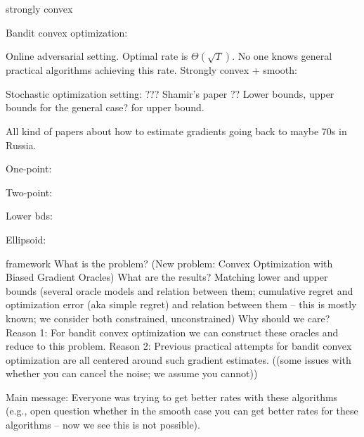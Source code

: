 
strongly convex


Bandit convex optimization:

Online adversarial setting. Optimal rate is $\Theta(\sqrt{T})$.
No one knows general practical algorithms achieving this rate.
Strongly convex + smooth: \cite{hazan2014bandit}

Stochastic optimization setting: ??? Shamir's paper \cite{shamir2012complexity}??
Lower bounds, upper bounds for the general case?
\cite{hazan2014bandit} for upper bound.

All kind of papers about how to estimate gradients going back to maybe 70s in Russia.

One-point: \cite{flaxman2005online}

Two-point: \cite{AgDeXi10}

Lower bds: \cite{raginsky2011information} \cite{Chen88:LB-AoS}

Ellipsoid: \cite{AgFoHsuKaRa13:SIAM}



 framework
What is the problem? (New problem: Convex Optimization with Biased Gradient Oracles)
What are the results? Matching lower and upper bounds (several oracle models and relation between them; cumulative regret and optimization error (aka simple regret) and relation between them -- this is mostly known; we consider both constrained, unconstrained)
Why should we care?
Reason 1: For bandit convex optimization we can construct these oracles and reduce to this problem.
Reason 2: Previous practical attempts for bandit convex optimization are all centered around such gradient estimates.
((some issues with whether you can cancel the noise; we assume you cannot))

Main message: Everyone was trying to get better rates with these algorithms (e.g., open question whether in the smooth case you can get better rates for these algorithms -- now we see this is not possible).
\fi
